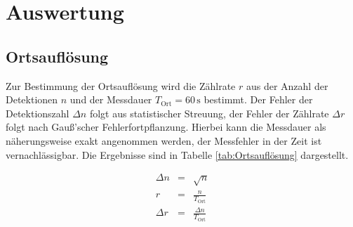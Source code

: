 \documentclass[12pt,a4paper]{scrartcl}
\numberwithin{equation}{section} %
\begin{document}
\clearpage
\hypertarget{auswertung}{%
\section{Auswertung}\label{auswertung}}
\hypertarget{auswertung-ortsaufluxf6sung}{\subsection{Ortsauflösung}\label{auswertung-ortsaufluxf6sung}}
Zur Bestimmung der Ortsauflösung wird die Zählrate $r$ aus der Anzahl der Detektionen $n$ und der Messdauer $T_\mathrm{Ort}=60\,\mathrm{s}$ bestimmt. Der Fehler der Detektionszahl $\Delta n$ folgt aus statistischer Streuung, der Fehler der Zählrate $\Delta r$ folgt nach Gauß'scher Fehlerfortpflanzung. Hierbei kann die Messdauer als näherungsweise exakt angenommen werden, der Messfehler in der Zeit ist vernachlässigbar. Die Ergebnisse sind in Tabelle \ref{tab:Ortsauflösung} dargestellt.

\begin{eqnarray}
	\Delta n &=& \sqrt{n} \label{eq:Delta n} \\
	r &=& \frac{n}{T_\mathrm{Ort}} \label{eq:Zählrate} \\
	\Delta r &=& \frac{\Delta n}{T_\mathrm{Ort}}
\end{eqnarray}
\end{document}

